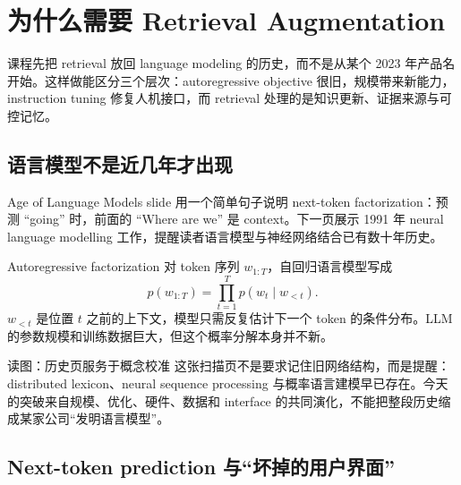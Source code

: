 \section{为什么需要 Retrieval Augmentation}

课程先把 retrieval 放回 language modeling 的历史，而不是从某个 2023 年产品名开始。这样做能区分三个层次：autoregressive objective 很旧，规模带来新能力，instruction tuning 修复人机接口，而 retrieval 处理的是知识更新、证据来源与可控记忆。

\subsection{语言模型不是近几年才出现}

Age of Language Models slide 用一个简单句子说明 next-token factorization：预测 ``going'' 时，前面的 ``Where are we'' 是 context。下一页展示 1991 年 neural language modelling 工作，提醒读者语言模型与神经网络结合已有数十年历史。


\begin{importantbox}{Autoregressive factorization}
对 token 序列 $w_{1:T}$，自回归语言模型写成
\[
p(w_{1:T})=\prod_{t=1}^{T}p(w_t\mid w_{<t}).
\]
$w_{<t}$ 是位置 $t$ 之前的上下文，模型只需反复估计下一个 token 的条件分布。LLM 的参数规模和训练数据巨大，但这个概率分解本身并不新。
\end{importantbox}


\begin{knowledgebox}{读图：历史页服务于概念校准}
这张扫描页不是要求记住旧网络结构，而是提醒：distributed lexicon、neural sequence processing 与概率语言建模早已存在。今天的突破来自规模、优化、硬件、数据和 interface 的共同演化，不能把整段历史缩成某家公司“发明语言模型”。
\end{knowledgebox}


\subsection{Next-token prediction 与“坏掉的用户界面”}

